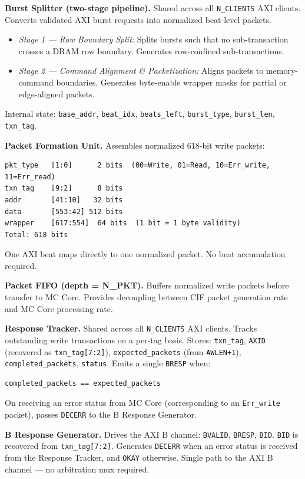 \documentclass[11pt, a4paper]{article}
\begin{document}
\textbf{Burst Splitter (two-stage pipeline).}
Shared across all \texttt{N\_CLIENTS} AXI clients. Converts validated AXI burst requests into normalized beat-level packets.
\begin{itemize}[noitemsep]
    \item \textit{Stage 1 — Row Boundary Split:} Splits bursts such that no sub-transaction crosses a DRAM row boundary. Generates row-confined sub-transactions.
    \item \textit{Stage 2 — Command Alignment \& Packetization:} Aligns packets to memory-command boundaries. Generates byte-enable wrapper masks for partial or edge-aligned packets.
\end{itemize}
Internal state: \texttt{base\_addr}, \texttt{beat\_idx}, \texttt{beats\_left}, \texttt{burst\_type}, \texttt{burst\_len}, \texttt{txn\_tag}.

\textbf{Packet Formation Unit.}
Assembles normalized 618-bit write packets:
\begin{lstlisting}
pkt_type   [1:0]      2 bits  (00=Write, 01=Read, 10=Err_write, 11=Err_read)
txn_tag    [9:2]      8 bits
addr       [41:10]   32 bits
data       [553:42] 512 bits
wrapper    [617:554]  64 bits  (1 bit = 1 byte validity)
Total: 618 bits
\end{lstlisting}
One AXI beat maps directly to one normalized packet. No beat accumulation required.

\textbf{Packet FIFO (depth = N\_PKT).}
Buffers normalized write packets before transfer to MC Core. Provides decoupling between CIF packet generation rate and MC Core processing rate.

\textbf{Response Tracker.}
Shared across all \texttt{N\_CLIENTS} AXI clients. Tracks outstanding write transactions on a per-tag basis. Stores: \texttt{txn\_tag}, \texttt{AXID} (recovered as \texttt{txn\_tag[7:2]}), \texttt{expected\_packets} (from \texttt{AWLEN+1}), \texttt{completed\_packets}, \texttt{status}. Emits a single \texttt{BRESP} when:
\begin{lstlisting}
completed_packets == expected_packets
\end{lstlisting}
On receiving an error status from MC Core (corresponding to an \texttt{Err\_write} packet), passes \texttt{DECERR} to the B Response Generator.

\textbf{B Response Generator.}
Drives the AXI B channel: \texttt{BVALID}, \texttt{BRESP}, \texttt{BID}. \texttt{BID} is recovered from \texttt{txn\_tag[7:2]}. Generates \texttt{DECERR} when an error status is received from the Response Tracker, and \texttt{OKAY} otherwise. Single path to the AXI B channel — no arbitration mux required.
\end{document}

